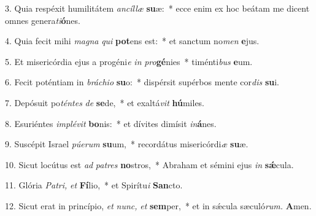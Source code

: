\item 3. Quia respéxit humilitátem \textit{ancíllæ} \textbf{su}æ:~* ecce enim ex hoc beátam me dicent omnes genera\hspace{0.03em}\textit{ti}\textbf{ó}nes.

\item 4. Quia fecit mihi \textit{magna} \textit{qui} \textbf{pot}ens est:~* et sanctum no\textit{men} \textbf{e}jus.

\item 5. Et misericórdia ejus a progéni\textit{e} \textit{in} \textit{pro}\textbf{gé}nies~* timénti\textit{bus} \textbf{e}um.

\item 6. Fecit poténtiam in \textit{bráchio} \textbf{su}o:~* dispérsit supérbos mente cor\textit{dis} \textbf{su}i.

\item 7. Depósuit po\textit{téntes} \textit{de} \textbf{se}de,~* et exaltá\textit{vit} \textbf{hú}miles.

\item 8. Esuriéntes \textit{implévit} \textbf{bo}nis:~* et dívites dimísit \textit{in}\textbf{á}nes.

\item 9. Suscépit Israel \textit{púerum} \textbf{su}um,~* recordátus misericórdi\hspace{0.03em}\textit{æ} \textbf{su}æ.

\item 10. Sicut locútus est \textit{ad} \textit{patres} \textbf{no}stros,~* Abraham et sémini ejus \textit{in} \textbf{sǽ}cula.

\item 11. Glória \textit{Patri,} \textit{et} \textbf{Fí}lio,~* et Spirítu\hspace{0.03em}\textit{i} \textbf{San}cto.

\item 12. Sicut erat in princípio, \textit{et} \textit{nunc,} \textit{et} \textbf{sem}per,~* et in sǽcula sæculó\textit{rum.} \textbf{A}men.